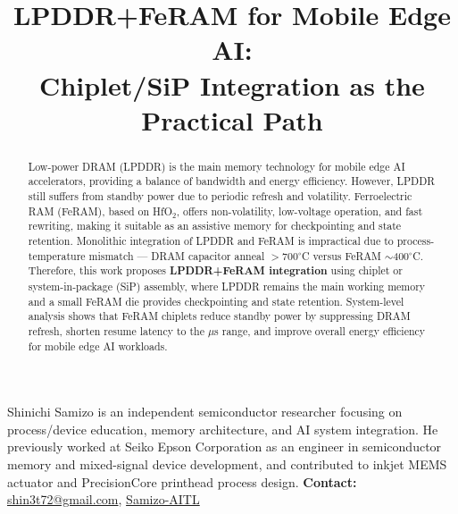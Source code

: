 \documentclass[10pt,conference]{IEEEtran}
\title{LPDDR+FeRAM for Mobile Edge AI:\\
Chiplet/SiP Integration as the Practical Path}
\author{%
  \IEEEauthorblockN{Shinichi Samizo}%
  \IEEEauthorblockA{Independent Semiconductor Researcher\\
  Former Engineer at Seiko Epson Corporation\\
  Email: \href{mailto:shin3t72@gmail.com}{shin3t72@gmail.com}\\
  GitHub: \href{https://github.com/Samizo-AITL}{Samizo-AITL}}%
}
\begin{document}
\maketitle

\begin{abstract}
Low-power DRAM (LPDDR) is the main memory technology for mobile edge AI accelerators, providing a balance of bandwidth and energy efficiency. 
However, LPDDR still suffers from standby power due to periodic refresh and volatility. 
Ferroelectric RAM (FeRAM), based on HfO$_2$, offers non-volatility, low-voltage operation, and fast rewriting, making it suitable as an assistive memory for checkpointing and state retention. 
Monolithic integration of LPDDR and FeRAM is impractical due to process-temperature mismatch --- DRAM capacitor anneal $>$700$^\circ$C versus FeRAM $\sim$400$^\circ$C. 
Therefore, this work proposes \textbf{LPDDR+FeRAM integration} using chiplet or system-in-package (SiP) assembly, where LPDDR remains the main working memory and a small FeRAM die provides checkpointing and state retention. 
System-level analysis shows that FeRAM chiplets reduce standby power by suppressing DRAM refresh, shorten resume latency to the $\mu$s range, and improve overall energy efficiency for mobile edge AI workloads.
\end{abstract}










\begingroup\small
\vspace{0.25\baselineskip}
\begin{IEEEbiographynophoto}{Shinichi Samizo}
is an independent semiconductor researcher focusing on process/device education, memory architecture, and AI system integration. 
He previously worked at Seiko Epson Corporation as an engineer in semiconductor memory and mixed-signal device development, and contributed to inkjet MEMS actuator and PrecisionCore printhead process design. 
\textbf{Contact:} \href{mailto:shin3t72@gmail.com}{shin3t72@gmail.com}, 
\href{https://github.com/Samizo-AITL}{Samizo-AITL}
\end{IEEEbiographynophoto}
\endgroup
\end{document}
